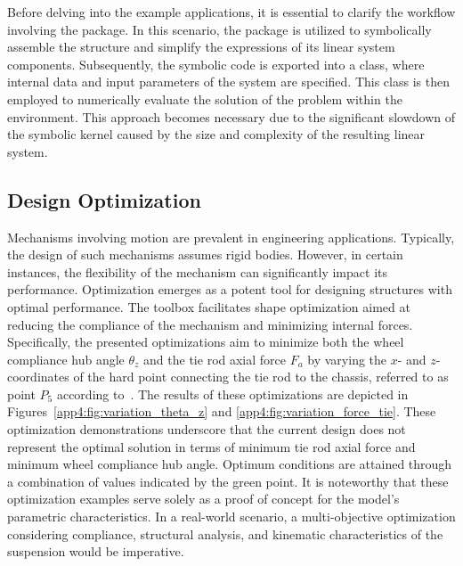 Before delving into the example applications, it is essential to clarify the workflow involving the \TrussMe{} package. In this scenario, the \TrussMe{} package is utilized to symbolically assemble the structure and simplify the expressions of its linear system components. Subsequently, the symbolic code is exported into a \Matlab{} class, where internal data and input parameters of the system are specified. This \Matlab{} class is then employed to numerically evaluate the solution of the problem within the \Simulink{} environment. This approach becomes necessary due to the significant slowdown of the symbolic kernel caused by the size and complexity of the resulting linear system.

\subsection{Design Optimization}

Mechanisms involving motion are prevalent in engineering applications. Typically, the design of such mechanisms assumes rigid bodies. However, in certain instances, the flexibility of the mechanism can significantly impact its performance. Optimization emerges as a potent tool for designing structures with optimal performance. The \TrussMe{} toolbox facilitates shape optimization aimed at reducing the compliance of the mechanism and minimizing internal forces. Specifically, the presented optimizations aim to minimize both the wheel compliance hub angle $\theta_z$ and the tie rod axial force $F_a$ by varying the $x$- and $z$- coordinates of the hard point connecting the tie rod to the chassis, referred to as point $P_5$ according to~\cite{larcher2024imece_symbolic}. The results of these optimizations are depicted in Figures~\ref{app4:fig:variation_theta_z} and \ref{app4:fig:variation_force_tie}. These optimization demonstrations underscore that the current design does not represent the optimal solution in terms of minimum tie rod axial force and minimum wheel compliance hub angle. Optimum conditions are attained through a combination of values indicated by the green point. It is noteworthy that these optimization examples serve solely as a proof of concept for the model's parametric characteristics. In a real-world scenario, a multi-objective optimization considering compliance, structural analysis, and kinematic characteristics of the suspension would be imperative.

